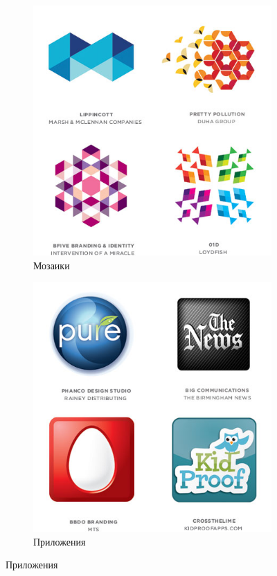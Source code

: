 \begin{figure}[h!]
  \vfill

  \centering
  \begin{subfigure}{.45\textwidth}
    \centering
    \includegraphics[width=\linewidth]{images/supplement/logolounge/2012/Mozaiki}
    \caption[]{Мозаики}
    \label{fig:logolounge:2012:mozaiki}
  \end{subfigure}
  \hfill
  \centering
  \begin{subfigure}{.45\textwidth}
    \centering
    \includegraphics[width=\linewidth]{images/supplement/logolounge/2012/Prilojeniya}
    \caption[]{Приложения}
    \label{fig:logolounge:2012:prilojeniya}
  \end{subfigure}
\end{figure}

